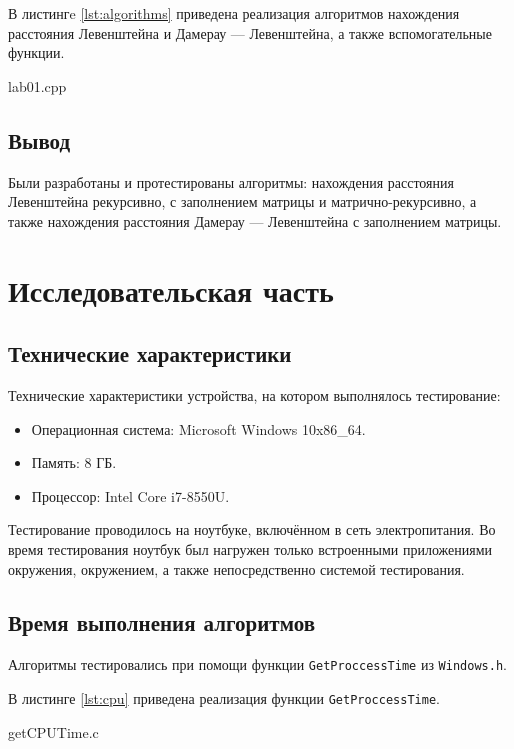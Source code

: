 \documentclass[a4paper,14pt, unknownkeysallowed]{extreport}
\newcommand{\code}[1]{\texttt{#1}}
\begin{document}
В листингe \ref{lst:algorithms} приведена реализация алгоритмов нахождения расстояния Левенштейна и Дамерау — Левенштейна, а также вспомогательные функции.

\begin{lstinputlisting}[
	caption={Листинг с алгоритмами},
	label={lst:algorithms},
	style={rust}
]{lab01.cpp}
\end{lstinputlisting}

\clearpage

\section{Вывод}

Были разработаны и протестированы алгоритмы: нахождения расстояния Левенштейна рекурсивно, с заполнением матрицы и матрично-рекурсивно, а также нахождения расстояния Дамерау — Левенштейна с заполнением матрицы.

\chapter{Исследовательская часть}

\section{Технические характеристики}

Технические характеристики устройства, на котором выполнялось тестирование:

\begin{itemize}
	\item Операционная система: Microsoft  Windows 10x86\_64.
	\item Память: 8 ГБ.
	\item Процессор: Intel Core i7-8550U.
\end{itemize}

Тестирование проводилось на ноутбуке, включённом в сеть электропитания. Во время тестирования ноутбук был нагружен только встроенными приложениями окружения, окружением, а также непосредственно системой тестирования.

\section{Время выполнения алгоритмов}

Алгоритмы тестировались при помощи функции \code{GetProccessTime} из \code{Windows.h}.

В листинге \ref{lst:cpu} приведена реализация функции \code{GetProccessTime}.
\begin{lstinputlisting}[
	caption={Листинг с алгоритмами},
	label={lst:cpu},
	style={rust}
]{getCPUTime.c}
\end{lstinputlisting}
\clearpage
\end{document}

